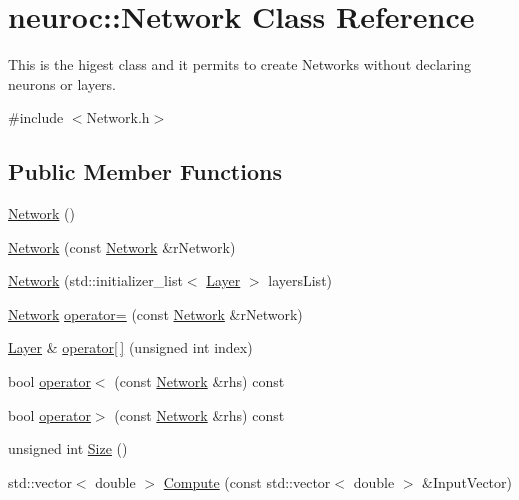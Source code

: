 \hypertarget{classneuroc_1_1_network}{\section{neuroc\-:\-:Network Class Reference}
\label{classneuroc_1_1_network}
}


This is the higest class and it permits to create Networks without declaring neurons or layers.  




{\ttfamily \#include $<$Network.\-h$>$}

\subsection*{Public Member Functions}
\begin{DoxyCompactItemize}
\item 
\hyperlink{classneuroc_1_1_network_ab8d8b0864cb82a851e28fa8e9e1a590c}{Network} ()
\item 
\hyperlink{classneuroc_1_1_network_ac19785f5ec3e58812fae9d7afc4b1161}{Network} (const \hyperlink{classneuroc_1_1_network}{Network} \&r\-Network)
\item 
\hyperlink{classneuroc_1_1_network_a0f078870d1dca3e769928a1a3840db7f}{Network} (std\-::initializer\-\_\-list$<$ \hyperlink{classneuroc_1_1_layer}{Layer} $>$ layers\-List)
\item 
\hyperlink{classneuroc_1_1_network}{Network} \hyperlink{classneuroc_1_1_network_a813b0bb15781045d0a2837481f30ec34}{operator=} (const \hyperlink{classneuroc_1_1_network}{Network} \&r\-Network)
\item 
\hyperlink{classneuroc_1_1_layer}{Layer} \& \hyperlink{classneuroc_1_1_network_a55d58a4d38bbd0117a2c1a10cd9b9860}{operator\mbox{[}$\,$\mbox{]}} (unsigned int index)
\item 
bool \hyperlink{classneuroc_1_1_network_a09f195224bd528d21e026cf9d834523f}{operator$<$} (const \hyperlink{classneuroc_1_1_network}{Network} \&rhs) const 
\item 
bool \hyperlink{classneuroc_1_1_network_a0bcb5cb5df5a91f8937fda63ead9d8e1}{operator$>$} (const \hyperlink{classneuroc_1_1_network}{Network} \&rhs) const 
\item 
unsigned int \hyperlink{classneuroc_1_1_network_aba5d3fd26af7841aca5dd0f0a1e92b21}{Size} ()
\item 
std\-::vector$<$ double $>$ \hyperlink{classneuroc_1_1_network_ae5a25de7431ce99d2ad7b2e6184e9b44}{Compute} (const std\-::vector$<$ double $>$ \&Input\-Vector)

\end{DoxyCompactItemize}
